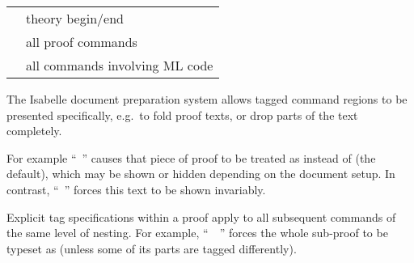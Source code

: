 \begin{isabellebody}
\begin{isamarkuptext}
  \medskip
  \begin{tabular}{ll}
    \isa{{\isaliteral{22}{\isachardoublequote}}theory{\isaliteral{22}{\isachardoublequote}}} & theory begin/end \\
    \isa{{\isaliteral{22}{\isachardoublequote}}proof{\isaliteral{22}{\isachardoublequote}}} & all proof commands \\
    \isa{{\isaliteral{22}{\isachardoublequote}}ML{\isaliteral{22}{\isachardoublequote}}} & all commands involving ML code \\
  \end{tabular}

  \medskip The Isabelle document preparation system
  \cite{isabelle-sys} allows tagged command regions to be presented
  specifically, e.g.\ to fold proof texts, or drop parts of the text
  completely.

  For example ``\hyperlink{command.by}{\mbox{}}~'' causes
  that piece of proof to be treated as  instead of
   (the default), which may be shown or hidden
  depending on the document setup.  In contrast, ``\hyperlink{command.by}{\mbox{}}~'' forces this text to be shown
  invariably.

  Explicit tag specifications within a proof apply to all subsequent
  commands of the same level of nesting.  For example, ``\hyperlink{command.proof}{\mbox{}}~~\hyperlink{command.qed}{\mbox{}}'' forces the whole
  sub-proof to be typeset as  (unless some of its parts
  are tagged differently).


\end{isamarkuptext}
\end{isabellebody}
